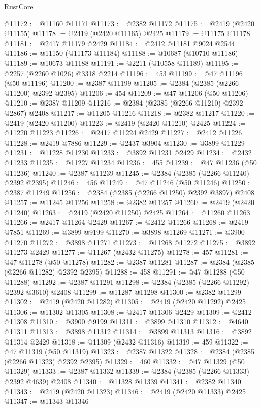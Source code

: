 \begin{lexlean}{RustCore}
\begin{coremodule}
@11172 := @11160 @11171
@11173 := @2382 @11172
@11175 := @2419 (@2420 @11155)
@11178 := @2419 (@2420 @11165) @2425
@11179 := @11175 @11178
@11181 := @2417 @11179 @2429
@11184 := @2412 @11181 @9024 @2544
@11186 := @11150 (@11173 @11184)
@11188 := @10687 (@10710 @11186)
@11189 := @10673 @11188
@11191 := @2211 (@10558 @11189)
@11195 := @2257 (@2260 @1026) @3318 @2214
@11196 := 453
@11199 := @47 @11196 (@50 @11196)
@11200 := @2387 @11199
@11205 := @2384 (@2385 (@2266 @11200) @2392 @2395)
@11206 := 454
@11209 := @47 @11206 (@50 @11206)
@11210 := @2387 @11209
@11216 := @2384 (@2385 (@2266 @11210) @2392 @2867) @2408
@11217 := @11205 @11216
@11218 := @2382 @11217
@11220 := @2419 (@2420 @11200)
@11223 := @2419 (@2420 @11210) @2425
@11224 := @11220 @11223
@11226 := @2417 @11224 @2429
@11227 := @2412 @11226
@11228 := @2419 @7886
@11229 := @2437 @3904
@11230 := @3899 @11229
@11231 := @11228 @11230
@11233 := @3892 @11231 @2429
@11234 := @2432 @11233
@11235 := @11227 @11234
@11236 := 455
@11239 := @47 @11236 (@50 @11236)
@11240 := @2387 @11239
@11245 := @2384 (@2385 (@2266 @11240) @2392 @2395)
@11246 := 456
@11249 := @47 @11246 (@50 @11246)
@11250 := @2387 @11249
@11256 := @2384 (@2385 (@2266 @11250) @2392 @3897) @2408
@11257 := @11245 @11256
@11258 := @2382 @11257
@11260 := @2419 (@2420 @11240)
@11263 := @2419 (@2420 @11250) @2425
@11264 := @11260 @11263
@11266 := @2417 @11264 @2429
@11267 := @2412 @11266
@11268 := @2419 @7851
@11269 := @3899 @9199
@11270 := @3898 @11269
@11271 := @3900 @11270
@11272 := @3898 @11271
@11273 := @11268 @11272
@11275 := @3892 @11273 @2429
@11277 := @11267 (@2432 @11275)
@11278 := 457
@11281 := @47 @11278 (@50 @11278)
@11282 := @2387 @11281
@11287 := @2384 (@2385 (@2266 @11282) @2392 @2395)
@11288 := 458
@11291 := @47 @11288 (@50 @11288)
@11292 := @2387 @11291
@11298 := @2384 (@2385 (@2266 @11292) @2392 @3610) @2408
@11299 := @11287 @11298
@11300 := @2382 @11299
@11302 := @2419 (@2420 @11282)
@11305 := @2419 (@2420 @11292) @2425
@11306 := @11302 @11305
@11308 := @2417 @11306 @2429
@11309 := @2412 @11308
@11310 := @3900 @9199
@11311 := @3899 @11310
@11312 := @4640 @11311
@11313 := @3898 @11312
@11314 := @3899 @11313
@11316 := @3892 @11314 @2429
@11318 := @11309 (@2432 @11316)
@11319 := 459
@11322 := @47 @11319 (@50 @11319)
@11323 := @2387 @11322
@11328 := @2384 (@2385 (@2266 @11323) @2392 @2395)
@11329 := 460
@11332 := @47 @11329 (@50 @11329)
@11333 := @2387 @11332
@11339 := @2384 (@2385 (@2266 @11333) @2392 @4639) @2408
@11340 := @11328 @11339
@11341 := @2382 @11340
@11343 := @2419 (@2420 @11323)
@11346 := @2419 (@2420 @11333) @2425
@11347 := @11343 @11346

\end{coremodule}
\end{lexlean}
